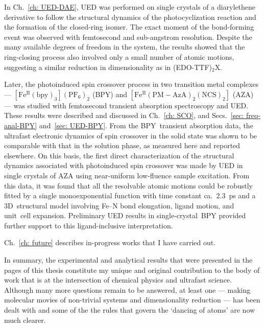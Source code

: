 In Ch.~\ref{ch: UED-DAE}, UED was performed on single crystals of a diarylethene derivative
to follow the structural dynamics of the photocyclization reaction
and the formation of the closed-ring isomer.
%
The exact moment of the bond-forming event was observed with femtosecond and sub-angstrom resolution.
Despite the many available degrees of freedom in the system,
the results showed that the ring-closing process also involved only a small number
of atomic motions, suggesting a similar reduction in dimensionality as in (EDO-TTF)$_2$X.

Later, the photoinduced spin crossover process in two transition metal complexes
--- $\mathrm{[Fe^{II}(bpy)_3](PF_6)_2}$ (BPY) and $\mathrm{[Fe^{II}(PM-AzA)_2 (NCS)_2]}$ (AZA)
--- was studied with femtosecond transient absorption spectroscopy and UED.
These results were described and discussed in Ch.~\ref{ch: SCO},
and Secs.~\ref{sec: freq-anal-BPY} and~\ref{sec: UED-BPY}.
%
From the BPY~transient absorption data, the ultrafast electronic dynamics of spin crossover in the solid state
was shown to be comparable with that in the solution phase, as measured here and
reported elsewhere.
%
On this basis, the first direct characterization of the structural dynamics associated with
photoinduced spin crossover was made by UED in single crystals of AZA
using near-uniform low-fluence sample excitation. From this data, it was found that
all the resolvable atomic motions could be robustly fitted by a single monoexponential function
with time constant ca.~$2.3$~ps and a 3D~structural model involving
Fe--N bond elongation, ligand motion, and unit~cell expansion.
%
Preliminary UED results in single-crystal~BPY provided further support to
this ligand-inclusive interpretation.

Ch.~\ref{ch: future} describes in-progress works that I have carried out.

In summary, the experimental and analytical results that were presented
in the pages of this thesis constitute my unique and original contribution to the body of work
that is at the intersection of chemical physics and ultrafast science.
%
Although many more questions remain to be answered, at least one ---
making molecular movies of non-trivial systems and dimensionality reduction ---
has been dealt with and some of the the rules that govern the `dancing of atoms' are now
much clearer.


